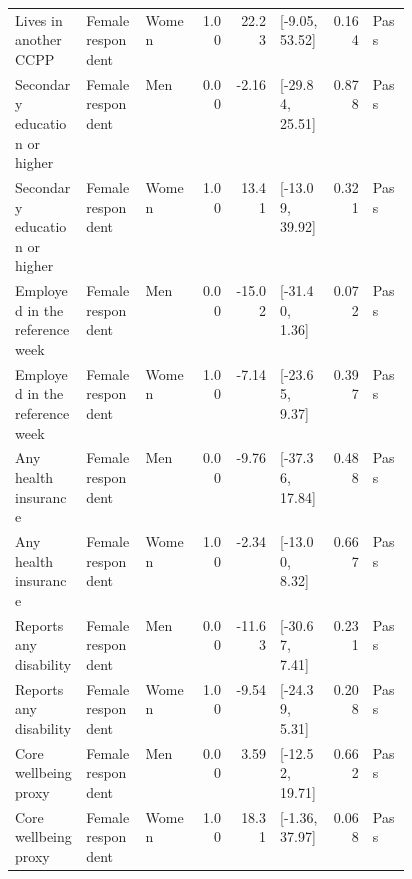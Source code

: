 \begin{longtable}{@{}p{0.18\linewidth}p{0.15\linewidth}lrrp{0.13\linewidth}rl@{}}
Lives in another CCPP & Female respondent & Women & 1.00 & 22.23 & [-9.05, 53.52] & 0.164 & Pass \\
Secondary education or higher & Female respondent & Men & 0.00 & -2.16 & [-29.84, 25.51] & 0.878 & Pass \\
Secondary education or higher & Female respondent & Women & 1.00 & 13.41 & [-13.09, 39.92] & 0.321 & Pass \\
Employed in the reference week & Female respondent & Men & 0.00 & -15.02 & [-31.40, 1.36] & 0.072 & Pass \\
Employed in the reference week & Female respondent & Women & 1.00 & -7.14 & [-23.65, 9.37] & 0.397 & Pass \\
Any health insurance & Female respondent & Men & 0.00 & -9.76 & [-37.36, 17.84] & 0.488 & Pass \\
Any health insurance & Female respondent & Women & 1.00 & -2.34 & [-13.00, 8.32] & 0.667 & Pass \\
Reports any disability & Female respondent & Men & 0.00 & -11.63 & [-30.67, 7.41] & 0.231 & Pass \\
Reports any disability & Female respondent & Women & 1.00 & -9.54 & [-24.39, 5.31] & 0.208 & Pass \\
Core wellbeing proxy & Female respondent & Men & 0.00 & 3.59 & [-12.52, 19.71] & 0.662 & Pass \\
Core wellbeing proxy & Female respondent & Women & 1.00 & 18.31 & [-1.36, 37.97] & 0.068 & Pass \\
\end{longtable}
\endgroup
